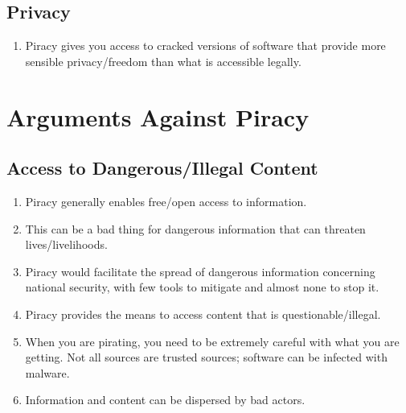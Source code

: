 \documentclass[onecolumn, 12pt]{article}
\begin{document}
\subsection{Privacy}

\begin{enumerate}
  \item Piracy gives you access to cracked versions of software that provide
    more sensible privacy/freedom than what is accessible
    legally.~\cite{stallman:right-to-read}
\end{enumerate}

\section{Arguments Against Piracy}

\subsection{Access to Dangerous/Illegal Content}
\begin{enumerate}
  \item Piracy generally enables free/open access to information.

  \item This can be a bad thing for dangerous information that can threaten
    lives/livelihoods.

  \item Piracy would facilitate the spread of dangerous information concerning
    national security, with few tools to mitigate and almost none to stop it.

  \item Piracy provides the means to access content that is questionable/illegal.

  \item When you are pirating, you need to be extremely careful with what you
    are getting. Not all sources are trusted sources; software can be infected
    with malware.

  \item Information and content can be dispersed by bad actors.
\end{enumerate}
\end{document}
